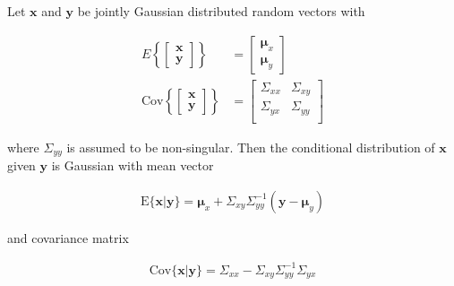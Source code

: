 \begin{lemma}

    Let $\mathbf{x}$ and $\mathbf{y}$ be jointly Gaussian distributed random
    vectors with

    \begin{align*}
        E\left\{\left[\begin{array}{c}
                          \mathbf{x}\\
                          \mathbf{y}
                      \end{array}\right]\right\}&=\left[\begin{array}{c}
                                                           \boldsymbol{\mu}_x\\
                                                           \boldsymbol{\mu}_y
                                                       \end{array}\right]\\
        \text{Cov}\left\{\left[\begin{array}{c}
                                   \mathbf{x}\\
                                   \mathbf{y}
                               \end{array}\right]\right\}&=\left[\begin{array}{cc}
                                                                     \Sigma_{xx} & \Sigma_{xy} \\
                                                                     \Sigma_{yx} & \Sigma_{yy} \\
                                                                  \end{array}\right]
    \end{align*}

    \noindent where $\Sigma_{yy}$ is assumed to be non-singular.
    Then the conditional distribution of $\mathbf{x}$ given $\mathbf{y}$ is
    Gaussian with mean vector

    \begin{align}
        \text{E}\{\mathbf{x}|\mathbf{y}\}=\boldsymbol{\mu}_x+\Sigma_{xy}\Sigma_{yy}^{-1}(\mathbf{y}-\boldsymbol{\mu}_y)\label{eq:conditionalMean}
    \end{align}

    \noindent and covariance matrix

    \begin{align}
        \text{Cov}\{\mathbf{x}|\mathbf{y}\}=\Sigma_{xx}-\Sigma_{xy}\Sigma_{yy}^{-1}\Sigma_{yx}\label{eq:conditionalCov}
    \end{align}

    \label{lemma:conditionalGaussians}

\end{lemma}

